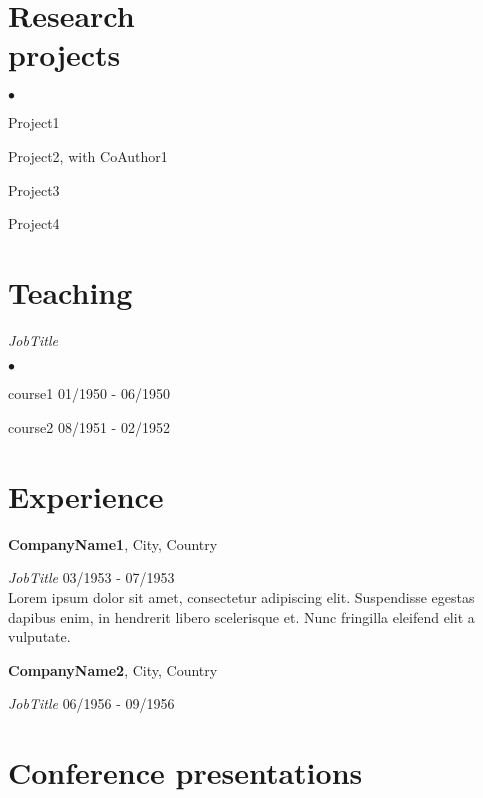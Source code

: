 \documentclass[margin, centered]{res} %
\newenvironment{list2}{
  \begin{list}{$\bullet$}{%
      \setlength{\itemsep}{0in}
      \setlength{\parsep}{0in} \setlength{\parskip}{0in}
      \setlength{\topsep}{0in} \setlength{\partopsep}{0in} 
      \setlength{\leftmargin}{0.2in}}}{\end{list}}
\begin{document}
\begin{resume}
\section{\sc Research \\ projects}
\begin{list2}
\item Project1\\[-0.3cm]
\item Project2, with CoAuthor1 \\[-0.3cm]
\item Project3\\[-0.3cm]
\item Project4
\end{list2}



\section{\sc Teaching}

{\em JobTitle}\\[-0.1cm]
\begin{list2}
\item course1 \hfill {01/1950  -  06/1950}\\[-0.25cm]
\item course2 \hfill {08/1951  -  02/1952}\\[-0.25cm]
\end{list2}


\section{\sc Experience}
{\bf CompanyName1}, City, Country

\vspace{-.3cm}
{\em JobTitle} \hfill {03/1953 - 07/1953}\\
Lorem ipsum dolor sit amet, consectetur adipiscing elit. Suspendisse egestas dapibus enim, in hendrerit libero scelerisque et. Nunc fringilla eleifend elit a vulputate. 

{\bf CompanyName2}, City, Country

\vspace{-.3cm}
{\em JobTitle} \hfill {06/1956 - 09/1956}\\

\section{\sc Conference presentations}


\end{resume}
\end{document}

